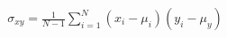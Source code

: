 \documentclass[preview]{standalone}
\begin{document}
\begin{align*}
\sigma_{xy} = \frac{1}{N-1}\sum_{i=1}^{N}(x_i - \mu_i)(y_i - \mu_y)
\end{align*}
\end{document}
